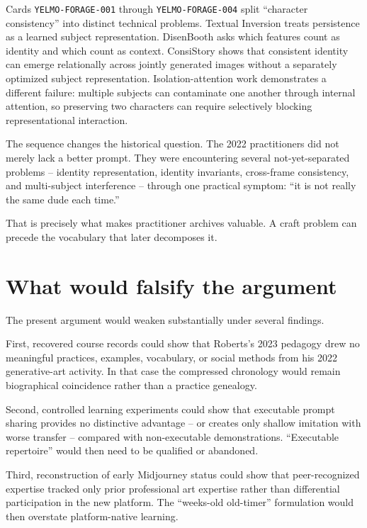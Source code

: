 \documentclass[11pt]{article}
\begin{document}
Cards \texttt{YELMO-FORAGE-001} through \texttt{YELMO-FORAGE-004} split ``character consistency'' into distinct technical problems. Textual Inversion treats persistence as a learned subject representation. DisenBooth asks which features count as identity and which count as context. ConsiStory shows that consistent identity can emerge relationally across jointly generated images without a separately optimized subject representation. Isolation-attention work demonstrates a different failure: multiple subjects can contaminate one another through internal attention, so preserving two characters can require selectively blocking representational interaction.

The sequence changes the historical question. The 2022 practitioners did not merely lack a better prompt. They were encountering several not-yet-separated problems -- identity representation, identity invariants, cross-frame consistency, and multi-subject interference -- through one practical symptom: ``it is not really the same dude each time.''

That is precisely what makes practitioner archives valuable. A craft problem can precede the vocabulary that later decomposes it.

\section{What would falsify the argument}

The present argument would weaken substantially under several findings.

First, recovered course records could show that Roberts's 2023 pedagogy drew no meaningful practices, examples, vocabulary, or social methods from his 2022 generative-art activity. In that case the compressed chronology would remain biographical coincidence rather than a practice genealogy.

Second, controlled learning experiments could show that executable prompt sharing provides no distinctive advantage -- or creates only shallow imitation with worse transfer -- compared with non-executable demonstrations. ``Executable repertoire'' would then need to be qualified or abandoned.

Third, reconstruction of early Midjourney status could show that peer-recognized expertise tracked only prior professional art expertise rather than differential participation in the new platform. The ``weeks-old old-timer'' formulation would then overstate platform-native learning.
\end{document}
